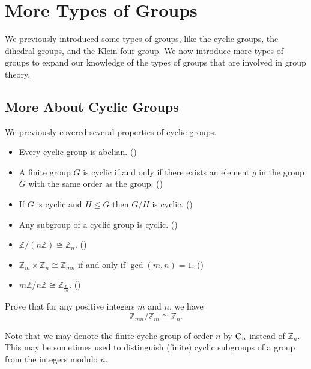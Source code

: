 \chapter{More Types of Groups}
We previously introduced some types of groups, like the cyclic groups, the dihedral groups, and the Klein-four group. We now introduce more types of groups to expand our knowledge of the types of groups that are involved in group theory.

\section{More About Cyclic Groups}
We previously covered several properties of cyclic groups.
\begin{itemize}
    \item Every cyclic group is abelian. ()
    \item A finite group $G$ is cyclic if and only if there exists an element $g$ in the group $G$ with the same order as the group. ()
    \item If $G$ is cyclic and $H \leq G$ then $G/H$ is cyclic. ()
    \item Any subgroup of a cyclic group is cyclic. ()
    \item $\mathbb{Z} / (n\mathbb{Z}) \cong \mathbb{Z}_n$. ()
    \item $\mathbb{Z}_m \times \mathbb{Z}_n \cong \mathbb{Z}_{mn}$ if and only if $\gcd(m,n) = 1$. ()
    \item $m\mathbb{Z} / n\mathbb{Z} \cong \mathbb{Z}_{\frac nm}$. ()
\end{itemize}

\begin{exercise}\label{exercise-Zmn-mod-Zn-cong-Zn}
    Prove that for any positive integers $m$ and $n$, we have
    \[
        \mathbb{Z}_{mn} / \mathbb{Z}_m \cong \mathbb{Z}_n.
    \]
\end{exercise}

Note that we may denote the finite cyclic group of order $n$ by $\mathrm{C}_{n}$ instead of $\mathbb{Z}_n$. This may be sometimes used to distinguish (finite) cyclic subgroups of a group from the integers modulo $n$.

